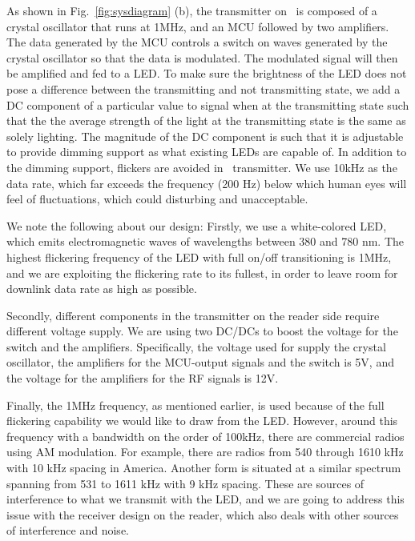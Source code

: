 As shown in Fig.~\ref{fig:sysdiagram} (b), the transmitter on \reader\ is composed of a crystal oscillator that runs at 1MHz, and an MCU followed by two amplifiers. The data generated by the MCU controls a switch on waves generated by the crystal oscillator so that the data is modulated. The modulated signal will then be amplified and fed to a LED. To make sure the brightness of the LED does not pose a difference between the transmitting and not transmitting state, we add a DC component of a particular value to signal when at the transmitting state such that the the average strength of the light at the transmitting state is the same as solely lighting. The magnitude of the DC component is such that it is adjustable to provide dimming support as what existing LEDs are capable of. In addition to the dimming support, flickers are avoided in \reader\ transmitter. We use 10kHz as the data rate, which far exceeds the frequency (200 Hz) below which human eyes will feel of fluctuations, which could disturbing and unacceptable. 

We note the following about our design: Firstly, we use a white-colored LED, which emits electromagnetic waves of wavelengths between 380 and 780 nm. The highest flickering frequency of the LED  with full on/off transitioning is 1MHz, and we are exploiting the flickering rate to its fullest, in order to leave room for downlink data rate as high as possible. 

Secondly, different components in the transmitter on the reader side require different voltage supply. We are using two DC/DCs to boost the voltage for the switch and the amplifiers. Specifically, the voltage used for supply the crystal oscillator, the amplifiers for the MCU-output signals and the switch is 5V, and the voltage for the amplifiers for the RF signals is 12V. 

Finally, the 1MHz frequency, as mentioned earlier, is used because of the full flickering capability we would like to draw from the LED. However, around this frequency with a bandwidth on the order of 100kHz, there are  commercial radios using AM modulation. For example, there are radios from 540 through 1610 kHz with 10 kHz spacing in America. Another form is situated at a similar spectrum spanning from 531 to 1611 kHz with 9 kHz spacing. These are sources of interference to what we transmit with the LED, and we are going to address this issue with the receiver design on the reader, which also deals with other sources of interference and noise.





